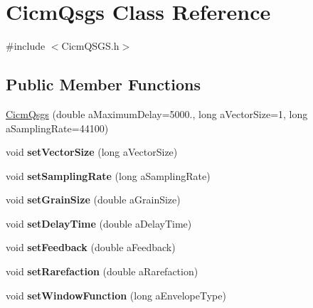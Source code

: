 \hypertarget{class_cicm_qsgs}{\section{Cicm\-Qsgs Class Reference}
\label{class_cicm_qsgs}
}


{\ttfamily \#include $<$Cicm\-Q\-S\-G\-S.\-h$>$}

\subsection*{Public Member Functions}
\begin{DoxyCompactItemize}
\item 
\hyperlink{class_cicm_qsgs_a91938da8f569f5f09c833c98ba25587a}{Cicm\-Qsgs} (double a\-Maximum\-Delay=5000., long a\-Vector\-Size=1, long a\-Sampling\-Rate=44100)
\item 
\hypertarget{class_cicm_qsgs_a1061794e8dda2b3697948ccfdc0995c8}{void {\bfseries set\-Vector\-Size} (long a\-Vector\-Size)}\label{class_cicm_qsgs_a1061794e8dda2b3697948ccfdc0995c8}

\item 
\hypertarget{class_cicm_qsgs_aefd4f65a487f0db8d4986e76edd8faf3}{void {\bfseries set\-Sampling\-Rate} (long a\-Sampling\-Rate)}\label{class_cicm_qsgs_aefd4f65a487f0db8d4986e76edd8faf3}

\item 
\hypertarget{class_cicm_qsgs_a22b7d66f92661c9d1060f3bd272173c2}{void {\bfseries set\-Grain\-Size} (double a\-Grain\-Size)}\label{class_cicm_qsgs_a22b7d66f92661c9d1060f3bd272173c2}

\item 
\hypertarget{class_cicm_qsgs_a0cdcf9b54fac5f4c8bdc12a9b28f2472}{void {\bfseries set\-Delay\-Time} (double a\-Delay\-Time)}\label{class_cicm_qsgs_a0cdcf9b54fac5f4c8bdc12a9b28f2472}

\item 
\hypertarget{class_cicm_qsgs_a76a57db026d6306e15afb5e61e8f3de2}{void {\bfseries set\-Feedback} (double a\-Feedback)}\label{class_cicm_qsgs_a76a57db026d6306e15afb5e61e8f3de2}

\item 
\hypertarget{class_cicm_qsgs_a28f0edebe5a5c05f0a8d1720de8ad45e}{void {\bfseries set\-Rarefaction} (double a\-Rarefaction)}\label{class_cicm_qsgs_a28f0edebe5a5c05f0a8d1720de8ad45e}

\item 
\hypertarget{class_cicm_qsgs_a7f8af4826e5ea0b1b763870000479655}{void {\bfseries set\-Window\-Function} (long a\-Envelope\-Type)}\label{class_cicm_qsgs_a7f8af4826e5ea0b1b763870000479655}


\end{DoxyCompactItemize}
